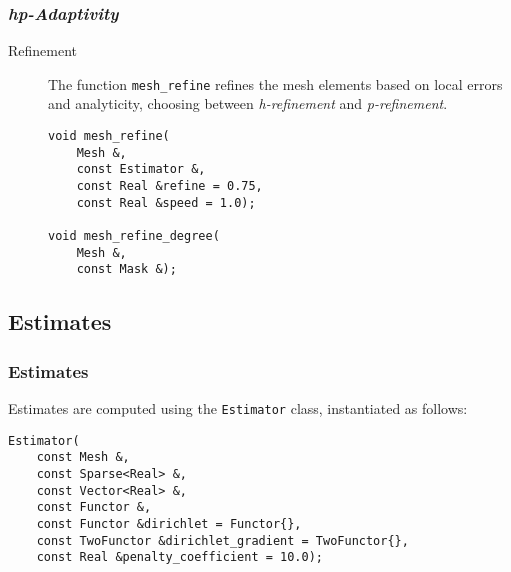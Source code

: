 \begin{frame}[fragile]
    \frametitle{\textit{hp-Adaptivity}}

    \begin{description}
        \item[Refinement] The function \lstinline{mesh_refine} refines the mesh elements based on local errors and analyticity, choosing between \textit{h-refinement} and \textit{p-refinement}.

\begin{lstlisting}[style=cpp]
void mesh_refine(
    Mesh &, 
    const Estimator &, 
    const Real &refine = 0.75, 
    const Real &speed = 1.0);

void mesh_refine_degree(
    Mesh &, 
    const Mask &);
\end{lstlisting}
    \end{description}

\end{frame}

\subsection{Estimates}

\begin{frame}[fragile]
    \frametitle{Estimates}

    Estimates are computed using the \lstinline{Estimator} class, instantiated as follows:

\begin{lstlisting}[style=cpp]
Estimator(
    const Mesh &, 
    const Sparse<Real> &, 
    const Vector<Real> &, 
    const Functor &, 
    const Functor &dirichlet = Functor{}, 
    const TwoFunctor &dirichlet_gradient = TwoFunctor{}, 
    const Real &penalty_coefficient = 10.0);
\end{lstlisting}

\end{frame}

